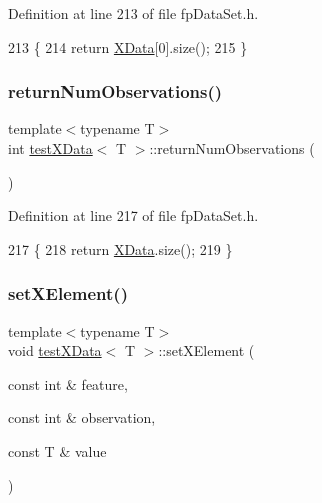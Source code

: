 Definition at line 213 of file fp\+Data\+Set.\+h.


\begin{DoxyCode}
213                                       \{
214             \textcolor{keywordflow}{return} \hyperlink{classtestXData_aabb02eb5f97c674d6a88c8194498b621}{XData}[0].size();
215         \}
\end{DoxyCode}
\mbox{\label{classtestXData_a11dc79bc56b7a5240c0b7c89e9fbeca1}} 
\subsubsection{\texorpdfstring{return\+Num\+Observations()}{returnNumObservations()}}
{\footnotesize\ttfamily template$<$typename T$>$ \\
int \hyperlink{classtestXData}{test\+X\+Data}$<$ T $>$\+::return\+Num\+Observations (\begin{DoxyParamCaption}{ }\end{DoxyParamCaption})\hspace{0.3cm}{\ttfamily [inline]}}



Definition at line 217 of file fp\+Data\+Set.\+h.


\begin{DoxyCode}
217                                           \{
218             \textcolor{keywordflow}{return} \hyperlink{classtestXData_aabb02eb5f97c674d6a88c8194498b621}{XData}.size();
219         \}
\end{DoxyCode}
\mbox{\label{classtestXData_a3e1c527719cb3f3535fd332270c91553}} 
\subsubsection{\texorpdfstring{set\+X\+Element()}{setXElement()}}
{\footnotesize\ttfamily template$<$typename T$>$ \\
void \hyperlink{classtestXData}{test\+X\+Data}$<$ T $>$\+::set\+X\+Element (\begin{DoxyParamCaption}\item[{const int \&}]{feature,  }\item[{const int \&}]{observation,  }\item[{const T \&}]{value }\end{DoxyParamCaption})\hspace{0.3cm}{\ttfamily [inline]}}



